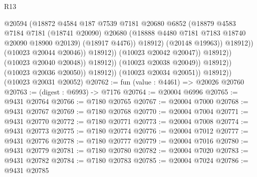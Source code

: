 \begin{lexlean}{R13}
\begin{coremodule}
                                              @20594
                                              (@18872
                                                @4584
                                                @187
                                                @7539
                                                @7181
                                                @20680
                                                @6852
                                                (@18879
                                                  @4583
                                                  @7184
                                                  @7181
                                                  (@18741 @20090)
                                                  @20680
                                                  (@18888
                                                    @4480
                                                    @7181
                                                    @7183
                                                    @18740
                                                    @20090
                                                    @18900
                                                    @20139)
                                                  (@18917 @4476))
                                                @18912)
                                              (@20148 @19963))
                                            @18912))
                                        (@10023 @20044 @20046))
                                      @18912))
                                  (@10023 @20042 @20047))
                                @18912))
                            (@10023 @20040 @20048))
                          @18912))
                      (@10023 @20038 @20049))
                    @18912))
                (@10023 @20036 @20050))
              @18912))
          (@10023 @20034 @20051))
        @18912))
    (@10023 @20031 @20052)
@20762 := fun (value : @4461) => @20026 @20760
@20763 := (digest : @6993) -> @7176
@20764 := @20004 @6996
@20765 := @9431 @20764
@20766 := @7180 @20765
@20767 := @20004 @7000
@20768 := @9431 @20767
@20769 := @7180 @20768
@20770 := @20004 @7004
@20771 := @9431 @20770
@20772 := @7180 @20771
@20773 := @20004 @7008
@20774 := @9431 @20773
@20775 := @7180 @20774
@20776 := @20004 @7012
@20777 := @9431 @20776
@20778 := @7180 @20777
@20779 := @20004 @7016
@20780 := @9431 @20779
@20781 := @7180 @20780
@20782 := @20004 @7020
@20783 := @9431 @20782
@20784 := @7180 @20783
@20785 := @20004 @7024
@20786 := @9431 @20785

\end{coremodule}
\end{lexlean}
